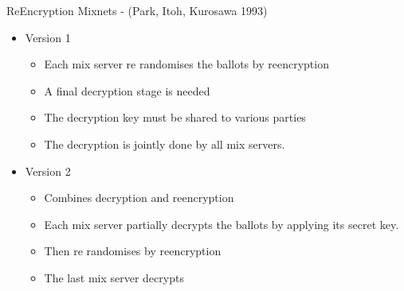 \documentclass{beamer}
\begin{document}
\begin{frame}{ReEncryption Mixnets - (Park, Itoh, Kurosawa 1993)}
\begin{itemize} 
\item Version 1
\begin{itemize}
	\item Each mix server re randomises the ballots by reencryption
	\item A final decryption stage is needed
	\item The decryption key must be shared to various parties
	\item The decryption is jointly done by all mix servers.
\end{itemize}
\item Version 2
\begin{itemize}
	\item Combines decryption and reencryption
	\item Each mix server partially decrypts the ballots by applying its secret key.
	\item Then re randomises by reencryption
	\item The last mix server decrypts
\end{itemize}
\end{itemize}
\end{frame} 
\end{document}
